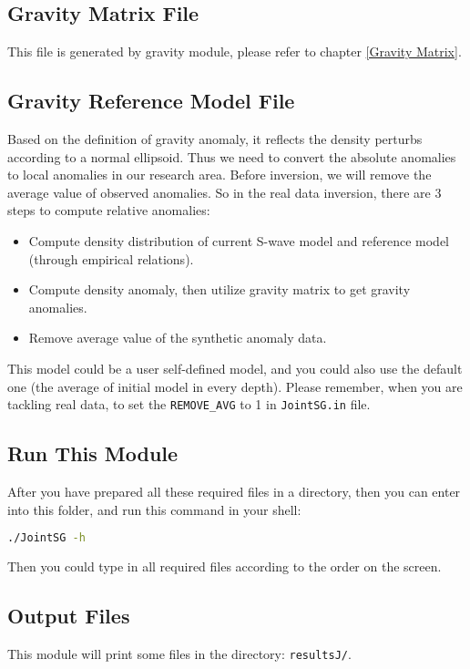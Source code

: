 \documentclass[UTF8]{article}
\begin{document}
\subsection{Gravity Matrix File}
This file is generated by gravity module, please refer to 
chapter \ref{Gravity Matrix}.

\subsection{Gravity Reference Model File}\label{Gravref}
Based on the definition of gravity anomaly, it reflects the 
density perturbs according to a normal ellipsoid. Thus we need 
to convert the absolute anomalies to local anomalies in our research 
area. Before inversion, we will remove the average value of 
observed anomalies. So in the real data 
inversion, there are 3 steps to compute relative anomalies:
\begin{itemize}
    \item Compute density distribution of 
        current S-wave model and reference model (through
        empirical relations).
    \item Compute density anomaly, then utilize gravity matrix
          to get gravity anomalies.
    \item Remove average value of the synthetic anomaly data.
\end{itemize}
This model could be a user self-defined model, and you could also use the 
default one (the average of initial model in every depth). Please 
remember, when you are tackling real data, to set the \texttt{REMOVE\_AVG} to 1 in \texttt{JointSG.in} file. 

\subsection{Run This Module}
After you have prepared all these required files in a directory, 
then you can enter into this folder, and run this command 
in your shell:
\begin{lstlisting}[language=bash]
./JointSG -h
\end{lstlisting}
Then you could type in all required files according to the 
order on the screen.

\subsection{Output Files}
This module will print some files in the directory: 
\verb!resultsJ/!. \\
\end{document}
